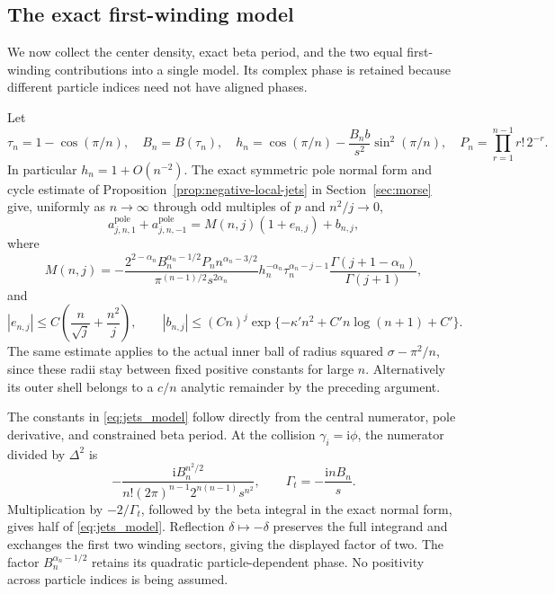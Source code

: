 \documentclass[11pt]{article}
\numberwithin{equation}{section}
\theoremstyle{definition}
\newcommand{\ii}{\mathrm i}
\begin{document}
\subsection{The exact first-winding model}

We now collect the center density, exact beta period, and the two equal
first-winding contributions into a single model. Its complex phase is
retained because different particle indices need not have aligned phases.

Let
\begin{equation}\label{eq:jets_model_parameters}
 \tau_n=1-\cos(\pi/n),\quad B_n=B(\tau_n),\quad
 h_n=\cos(\pi/n)-\frac{B_n b}{s^2}\sin^2(\pi/n),\quad
 P_n=\prod_{r=1}^{n-1}r!\,2^{-r}.
\end{equation}
In particular $h_n=1+O(n^{-2})$. The exact symmetric pole normal
form and cycle estimate of Proposition~\ref{prop:negative-local-jets}
in Section~\ref{sec:morse} give, uniformly
as $n\to\infty$ through odd multiples of $p$ and $n^2/j\to0$,
\begin{equation}\label{eq:jets_uniform_model}
 a_{j,n,1}^{\mathrm{pole}}+a_{j,n,-1}^{\mathrm{pole}}
 =M(n,j)(1+e_{n,j})+b_{n,j},
\end{equation}
where
\begin{equation}\label{eq:jets_model}
 M(n,j)=-\frac{2^{2-\alpha_n}B_n^{\alpha_n-1/2}P_n
                     n^{\alpha_n-3/2}}
                   {\pi^{(n-1)/2}s^{2\alpha_n}}
 h_n^{-\alpha_n}\tau_n^{\alpha_n-j-1}
 \frac{\Gamma(j+1-\alpha_n)}{\Gamma(j+1)},
\end{equation}
and
\begin{equation}\label{eq:jets_model_errors}
 |e_{n,j}|\le C\left(\frac n{\sqrt j}+\frac{n^2}j\right),\qquad
 |b_{n,j}|\le(Cn)^j
       \exp\{-\kappa' n^2+C'n\log(n+1)+C'\}.
\end{equation}
The same estimate applies to the actual inner ball of radius squared
$\sigma-\pi^2/n$, since these radii stay between fixed positive
constants for large $n$. Alternatively its outer shell belongs to a
$c/n$ analytic remainder by the preceding argument.

The constants in \eqref{eq:jets_model} follow directly from the central
numerator, pole derivative, and constrained beta period.
At the collision $\gamma_i=\ii\phi$, the numerator divided by
$\Delta^2$ is
\[
 -\frac{\ii B_n^{n^2/2}}
       {n!(2\pi)^{n-1}2^{n(n-1)}s^{n^2}},
 \qquad \Gamma_t=-\frac{\ii nB_n}s.
\]
Multiplication by $-2/\Gamma_t$, followed by the beta integral in
the exact normal form, gives half of \eqref{eq:jets_model}.
Reflection $\delta\mapsto-\delta$ preserves the full integrand and
exchanges the first two winding sectors, giving the displayed
factor of two. The factor $B_n^{\alpha_n-1/2}$ retains its quadratic
particle-dependent phase. No positivity across particle indices is
being assumed.
\end{document}

